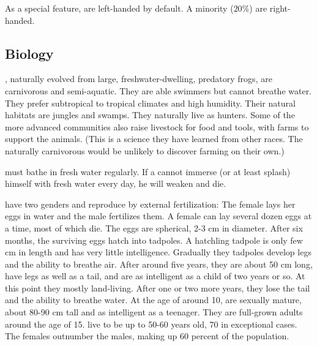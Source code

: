As a special feature, \meccara{} are left-handed by default. A minority ($20\%$) are right-handed. 









\subsection{Biology}
\Meccara{}, naturally evolved from large, freshwater-dwelling, predatory frogs, are carnivorous and semi-aquatic. They are able swimmers but cannot breathe water. They prefer subtropical to tropical climates and high humidity. Their natural habitats are jungles and swamps. They naturally live as hunters. Some of the more advanced \meccaran{} communities also raise livestock for food and tools, with farms to support the animals. (This is a science they have learned from other races. The naturally carnivorous \meccara{} would be unlikely to discover farming on their own.) 


\Meccara{} must bathe in fresh water regularly. If a \meccaran{} cannot immerse (or at least splash) himself with fresh water every day, he will weaken and die. 

\Meccara{} have two genders and reproduce by external fertilization: The female lays her eggs in water and the male fertilizes them. A female can lay several dozen eggs at a time, most of which die. The eggs are spherical, 2-3 cm in diameter. After six months, the surviving eggs hatch into tadpoles. A hatchling tadpole is only few cm in length and has very little intelligence. Gradually they tadpoles develop legs and the ability to breathe air. After around five years, they are about 50 cm long, have legs as well as a tail, and are as intelligent as a \human{} child of two years or so. At this point they mostly land-living. After one or two more years, they lose the tail and the ability to breathe water. At the age of around 10, \meccara{} are sexually mature, about 80-90 cm tall and as intelligent as a \human{} teenager. They are full-grown adults around the age of 15. \Meccara{} live to be up to 50-60 years old, 70 in exceptional cases. The females outnumber the males, making up 60 percent of the population. 


